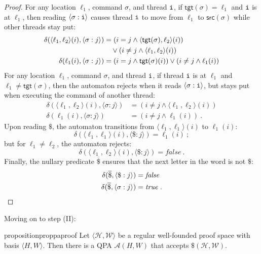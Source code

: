 \documentclass[9pt,nocopyrightspace]{sigplanconf}
\theoremstyle{definition}
\newcommand{\tuple}[1]{\langle #1 \rangle}
\newcommand{\true}{\textit{true}}
\newcommand{\false}{\textit{false}}
\newcommand{\rankformulas}{\mathscr{W}}
\newcommand{\idx}[1]{\text{\rm\texttt{#1}}}
\newcommand{\ic}[2]{{\tuple{#1 : #2}}}
\newcommand{\src}{\textsf{src}}
\newcommand{\tgt}{\textsf{tgt}}
\begin{document}
\begin{proof}
  For any location $\ell_1$, command $\sigma$, and thread $\idx{i}$, if
  $\tgt(\sigma) = \ell_1$ and $\idx{i}$ is at $\ell_1$, then reading
  $\ic{\sigma}{\idx{i}}$ causes thread $\idx{i}$ to move from $\ell_1$ to
  $\src(\sigma)$ while other threads stay put:
  \begin{align*}
    \delta(\tuple{\ell_1,\ell_2}(i), \ic{\sigma}{j}) &=
    (i = j \land \tuple{\tgt(\sigma),\ell_2}(i))\\
    &\hspace*{10pt}\lor (i \neq j \land \tuple{\ell_1,\ell_2}(i))\\
    \delta(\ell_1(i), \ic{\sigma}{j}) &= (i = j \land \tgt(\sigma)(i)) \lor (i \neq j \land \ell_1(i))
  \end{align*}
  For any location $\ell_1$, command $\sigma$, and thread $\idx{i}$, if thread
  $\idx{i}$ is at $\ell_1$ and $\ell_1 \neq \tgt(\sigma)$, then the automaton
  rejects when it reads $\ic{\sigma}{\idx{i}}$, but stays put when executing
  the command of another thread:
  \begin{align*}
    \delta(\tuple{\ell_1,\ell_2}(i), \ic{\sigma}{j}) &= (i \neq j \land \tuple{\ell_1,\ell_2}(i))\\
    \delta(\ell_1(i), \ic{\sigma}{j}) &= (i \neq j \land \ell_1(i))\ .
  \end{align*}
  Upon reading $\$$, the automaton transitions from $\tuple{\ell_1,\ell_1}(i)$
  to $\ell_1(i)$:
  \[
  \delta(\tuple{\ell_1,\ell_1}(i), \ic{\$}{j}) = \ell_1(i)\ ;
  \]
  but for $\ell_1 \neq \ell_2$, the automaton rejects:
  \[
  \delta(\tuple{\ell_1,\ell_2}(i), \ic{\$}{j}) = \false\ .
  \]
  Finally, the nullary predicate $\overline{\$}$ ensures that the next
  letter in the word is not $\$$:
  \begin{align*}
    \delta(\overline{\$}, \ic{\$}{j}) &= \false\\
    \delta(\overline{\$}, \ic{\sigma}{j}) &= \true\ . \qedhere
  \end{align*}



\end{proof}















Moving on to step (II):
\begin{restatable}{proposition}{proppaproof}
\label{prop:pa-proof}
   Let $\tuple{\mathscr{H},\rankformulas}$ be a regular well-founded proof space with basis $\tuple{H,W}$.  Then there is a QPA
   $\mathcal{A}(H,W)$ that accepts $\$(\mathscr{H},\rankformulas)$.
\end{restatable}
\end{document}

